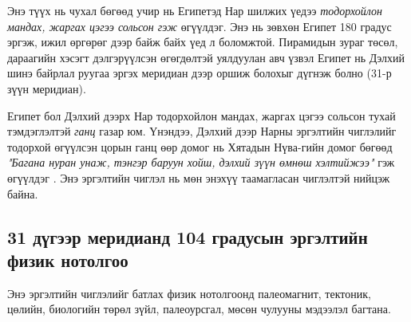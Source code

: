 \documentclass[10pt,twocolumn,letterpaper]{article}
\begin{document}
Энэ түүх нь чухал бөгөөд учир нь Египетэд Нар шилжих үедээ \textit{тодорхойлон мандах, жаргах цэгээ сольсон гэж} өгүүлдэг. Энэ нь зөвхөн Египет 180 градус эргэж, ижил өргөрөг дээр байж байх үед л боломжтой. Пирамидын зураг төсөл, дараагийн хэсэгт дэлгэрүүлсэн өгөгдөлтэй уялдуулан авч үзвэл Египет нь Дэлхий шинэ байрлал руугаа эргэх меридиан дээр оршиж болохыг дүгнэж болно (31-р зүүн меридиан).

Египет бол Дэлхий дээрх Нар тодорхойлон мандах, жаргах цэгээ сольсон тухай тэмдэглэлтэй \textit{ганц} газар юм. Үнэндээ, Дэлхий дээр Нарны эргэлтийн чиглэлийг тодорхой өгүүлсэн цорын ганц өөр домог нь Хятадын Нүва-гийн домог бөгөөд \textit{"Багана нуран унаж, тэнгэр баруун хойш, дэлхий зүүн өмнөш хэлтийжээ"} гэж өгүүлдэг \cite{8}. Энэ эргэлтийн чиглэл нь мөн энэхүү таамагласан чиглэлтэй нийцэж байна.

\subsection{31 дүгээр меридианд 104 градусын эргэлтийн физик нотолгоо}

Энэ эргэлтийн чиглэлийг батлах физик нотолгоонд палеомагнит, тектоник, цөлийн, биологийн төрөл зүйл, палеоурсгал, мөсөн чулууны мэдээлэл багтана.
\end{document}
